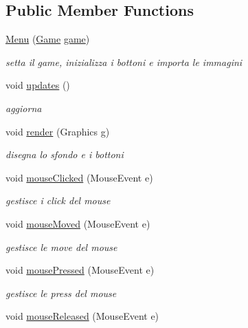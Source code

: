 \subsection*{Public Member Functions}
\begin{DoxyCompactItemize}
\item 
\hyperlink{classscenes_1_1_menu_aa568425829ee847c6c97c418516a3c81}{Menu} (\hyperlink{classprogetto_1_1_game}{Game} \hyperlink{classscenes_1_1_game_scene_ac6a5ed6191fcf3a5bf0445921feb4f48}{game})
\begin{DoxyCompactList}\small\item\em setta il game, inizializza i bottoni e importa le immagini \end{DoxyCompactList}\item 
void \hyperlink{classscenes_1_1_menu_a79c40c8c02ea1005b787c02252e57172}{updates} ()
\begin{DoxyCompactList}\small\item\em aggiorna \end{DoxyCompactList}\item 
void \hyperlink{classscenes_1_1_menu_a203b6ad9d5e4d54dd1152986eec4dedc}{render} (Graphics g)
\begin{DoxyCompactList}\small\item\em disegna lo sfondo e i bottoni \end{DoxyCompactList}\item 
void \hyperlink{classscenes_1_1_menu_a45d56bd84238e8b56589dfc732e2b2cf}{mouse\+Clicked} (Mouse\+Event e)
\begin{DoxyCompactList}\small\item\em gestisce i click del mouse \end{DoxyCompactList}\item 
void \hyperlink{classscenes_1_1_menu_a2ca251710b65639ec80bc141edde60aa}{mouse\+Moved} (Mouse\+Event e)
\begin{DoxyCompactList}\small\item\em gestisce le move del mouse \end{DoxyCompactList}\item 
void \hyperlink{classscenes_1_1_menu_aed82e1ce3dd3cf283d508c3ba3be70ef}{mouse\+Pressed} (Mouse\+Event e)
\begin{DoxyCompactList}\small\item\em gestisce le press del mouse \end{DoxyCompactList}\item 
void \hyperlink{classscenes_1_1_menu_a87a07291794e15052db67f945d90853e}{mouse\+Released} (Mouse\+Event e)

\end{DoxyCompactItemize}
